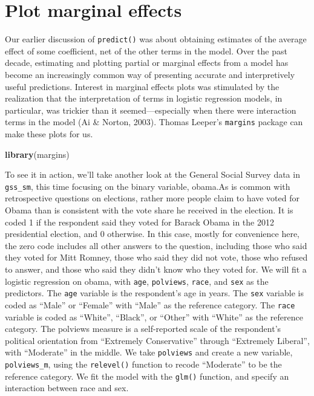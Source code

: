 \documentclass[]{book}
\newenvironment{Shaded}{\begin{snugshade}}{\end{snugshade}}
\newcommand{\KeywordTok}[1]{\textcolor[rgb]{0.13,0.29,0.53}{\textbf{#1}}}
\newcommand{\NormalTok}[1]{#1}
\begin{document}
\hypertarget{plot-marginal-effects}{%
\section{Plot marginal effects}\label{plot-marginal-effects}}

Our earlier discussion of \texttt{predict()} was about obtaining estimates of the average effect of some coefficient, net of the other terms in the model. Over the past decade, estimating and plotting partial or marginal effects from a model has become an increasingly common way of presenting accurate and interpretively useful predictions. Interest in marginal effects plots was stimulated by the realization that the interpretation of terms in logistic regression models, in particular, was trickier than it seemed---especially when there were interaction terms in the model (Ai \& Norton, 2003). Thomas Leeper's \texttt{margins} package can make these plots for us.

\begin{Shaded}
\begin{Highlighting}[]
\KeywordTok{library}\NormalTok{(margins)}
\end{Highlighting}
\end{Shaded}

To see it in action, we'll take another look at the General Social Survey data in \texttt{gss\_sm}, this time focusing on the binary variable, obama.As is common with retrospective questions on elections, rather more people claim to have voted for Obama than is consistent with the vote share he received in the election. It is coded 1 if the respondent said they voted for Barack Obama in the 2012 presidential election, and 0 otherwise. In this case, mostly for convenience here, the zero code includes all other answers to the question, including those who said they voted for Mitt Romney, those who said they did not vote, those who refused to answer, and those who said they didn't know who they voted for. We will fit a logistic regression on obama, with \texttt{age}, \texttt{polviews}, \texttt{race}, and \texttt{sex} as the predictors. The \texttt{age} variable is the respondent's age in years. The \texttt{sex} variable is coded as ``Male'' or ``Female'' with ``Male'' as the reference category. The \texttt{race} variable is coded as ``White'', ``Black'', or ``Other'' with ``White'' as the reference category. The polviews measure is a self-reported scale of the respondent's political orientation from ``Extremely Conservative'' through ``Extremely Liberal'', with ``Moderate'' in the middle. We take \texttt{polviews} and create a new variable, \texttt{polviews\_m}, using the \texttt{relevel()} function to recode ``Moderate'' to be the reference category. We fit the model with the \texttt{glm()} function, and specify an interaction between race and sex.
\end{document}
